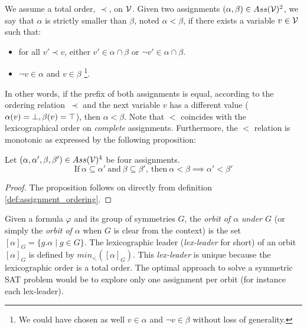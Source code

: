 \begin{definition}\label{def:assignment_ordering}%
 We assume a total order, $\prec$, on $\mathcal{V}$.  Given two assignments $(\alpha,\beta) \in Ass(\mathcal{V})^2 $,%
 we say that $\alpha$ is strictly smaller than $\beta$, noted $\alpha < \beta$, if there exists a variable $v \in \mathcal{V}$%
 such that:%
 \begin{itemize}%
  \item for all $v' \prec v$, either $v' \in \alpha \cap \beta$ or $\neg v' \in \alpha \cap \beta$.%
  \item $\neg v \in \alpha$ and $v \in \beta$ \footnote{We could have chosen as well $v \in \alpha$ and $\neg v \in \beta$ without loss of generality.}.%
 \end{itemize}%
\end{definition}
In other words, if the prefix of both assignments is equal, according to the ordering relation~$\prec$
and the next variable $v$ has a different value ($\alpha(v) = \bot, \beta(v) = \top$), then $\alpha < \beta$.
Note that $<$ coincides with the lexicographical order on \emph{complete}
assignments. 
Furthermore, the $<$ relation is monotonic as expressed by the following proposition:
\begin{proposition}
 \label{prop:monocity_assignments_ordering}
 Let  $(\alpha,\alpha',\beta,\beta') \in Ass(\mathcal{V})^4 $ be four assignments.
 $$\text{If}~\alpha \subseteq \alpha'~\text{and}~\beta \subseteq \beta',~\text{then}~\alpha < \beta \implies \alpha' < \beta'$$
\end{proposition}
\begin{proof}
 The proposition follows on directly from definition \ref{def:assignment_ordering}.
\end{proof}
Given a formula $\varphi$ and its group of symmetries $G$,
the \emph{orbit of $\alpha$ under $G$} (or
simply the \emph{orbit of $\alpha$} when $G$ is clear from the context) is the set
$ [\alpha]_G=\{ g.\alpha \mid g \in G \}$. 
The lexicographic leader (\textit{lex-leader} for short) of an orbit $[\alpha]_G$ is defined by
$min_<([\alpha]_G)$. This \textit{lex-leader} is unique because the lexicographic
order is a total order.
The optimal approach to solve a symmetric SAT problem would be to explore
only one assignment per orbit (for instance each lex-leader).
% 

